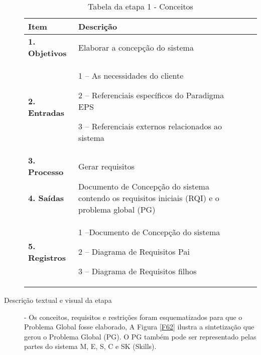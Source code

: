 \begin{description}

\begin{table}[htbp]
	\centering
	\caption{Tabela da etapa 1 - Conceitos}
	\begin{tabular}{|l| p{13.5cm}| c| c| } \hline
		\textbf {Item} 	   & \textbf {Descrição}	 \\ \hline
		\textbf{1. Objetivos} &  
		Elaborar a concepção do sistema\\ \hline
		\textbf{2. Entradas}  &		 
		1 -- As necessidades do cliente\par  	
		2 -- Referenciais específicos do Paradigma EPS\par 	
		3 -- Referenciais externos relacionados ao sistema  \\ \hline	
		\textbf{3. Processo}    & Gerar requisitos \\ \hline
		\textbf{4. Saídas}	     & 
		Documento de Concepção do sistema contendo os requisitos iniciais (RQI) e o problema global (PG)\\ \hline
		\textbf{5. Registros}	& 	
		1 --Documento de Concepção do sistema \par
		2 -- Diagrama de Requisitos Pai \par
		3 -- Diagrama de Requisitos filhos\\ \hline
	\end{tabular}
	\label{T3}\par
\end{table}

\item[Descrição textual e visual da etapa] - Os conceitos, requisitos e restrições foram esquematizados para que o Problema Global fosse elaborado, A Figura \ref{F62} ilustra a sintetização que gerou o Problema Global (PG).  O PG também pode ser representado pelas partes do sistema M, E, S, C e SK (Skills).


\end{description}

